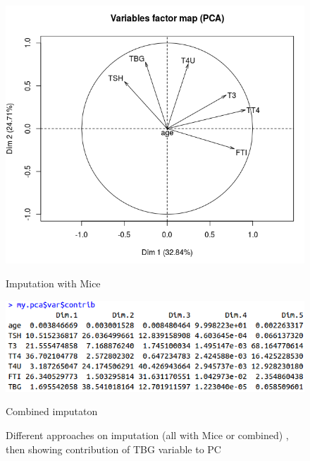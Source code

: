 \documentclass{article}
\begin{document}
\begin{figure}[H]
%
  \centering
  \includegraphics[width=\linewidth]{img/Missing_all_1f.png}
  \caption{Imputation with Mice}\label{missing_contrib1}
\endminipage\hfill
{}%
  \centering
  \includegraphics[width=\linewidth]{img/MIssing_imputecondition_contrib.png}
  \caption{Combined imputaton}\label{missing_contrib2}
\endminipage
\caption{Different approaches on imputation (all with Mice or combined) , then showing contribution of TBG variable to PC}
\end{figure}
\end{document}
